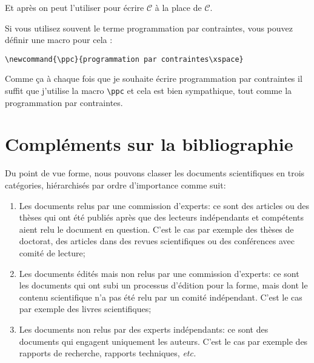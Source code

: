 \documentclass{rapport}
\def\etc{\textit{etc.}\xspace}
\begin{document}
      \newcommand{\mc}[1]{\ensuremath{\mathcal{#1}}}
      
      Et après on peut l'utiliser pour écrire \mc{C} à la place de $\mathcal{C}$.
      
      Si vous utilisez souvent le terme programmation par contraintes, vous pouvez définir une macro pour cela :
      \begin{verbatim}
\newcommand{\ppc}{programmation par contraintes\xspace}\end{verbatim}
        
      \newcommand{\ppc}{programmation par contraintes\xspace}
      
      Comme ça à chaque fois que je souhaite écrire \ppc il suffit que j'utilise la macro \verb|\ppc| et cela est bien sympathique, tout comme la \ppc.
      
    \pageblanche
    \appendix
    
    \section{Compléments sur la bibliographie} 
      Du point de vue forme, nous pouvons classer les documents scientifiques en trois catégories, hiérarchisés par ordre d'importance comme suit:
      
      \begin{enumerate}
        \item Les documents relus par une commission d'experts: ce sont des articles ou des thèses qui ont été publiés après que des lecteurs indépendants et compétents aient relu le document en question. C'est le cas par exemple des thèses de doctorat, des articles dans des revues scientifiques ou des conférences avec comité de lecture;
        \item Les documents édités mais non relus par une commission d'experts: ce sont les documents qui ont subi un processus d'édition pour la forme, mais dont le contenu scientifique n'a pas été relu par un comité indépendant. C'est le cas par exemple des livres scientifiques;
        \item Les documents non relus par des experts indépendants: ce sont des documents qui engagent uniquement les auteurs. C'est le cas par exemple des rapports de recherche, rapports techniques, \etc
      \end{enumerate}
      
\end{document}
